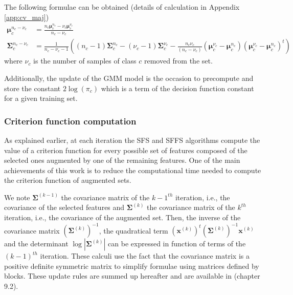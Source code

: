 \documentclass[a4paper,11pt,DIV=16]{scrartcl}
\begin{document}
        The following formulae can be obtained (details of calculation in Appendix \ref{app:cv_maj})
        \begin{align}
            \boldsymbol{\mu}_c^{n_c-\nu_c} &= \frac{n_c \boldsymbol{\mu}_c^{n_c} - \nu_c \boldsymbol{\mu}_c^{\nu_c}}{n_c - \nu_c} \\
            \boldsymbol{\Sigma}_c^{n_c-\nu_c} &= \frac{1}{n_c-\nu_c-1} ( (n_c-1) \boldsymbol{\Sigma}_c^{n_c} - (\nu_c-1) \boldsymbol{\Sigma}_c^{\nu_c} - \frac{n_c \nu_c}{(n_c-\nu_c)} (\boldsymbol{\mu}_c^{\nu_c}-\boldsymbol{\mu}_c^{n_c})(\boldsymbol{\mu}_c^{\nu_c}-\boldsymbol{\mu}_c^{n_c})^t)
        \end{align}
        where $\nu_c$ is the number of samples of class $c$ removed from the set.

        Additionally, the update of the GMM model is the occasion to precompute and store the constant $2 \log (\pi_c)$ which is a term of the decision function constant for a given training set.

        \subsubsection{Criterion function computation}

        As explained earlier, at each iteration the SFS and SFFS algorithms compute the value of a criterion function for every possible set of features composed of the selected ones augmented by one of the remaining features. One of the main achievements of this work is to reduce the computational time needed to compute the criterion function of augmented sets.

        We note $\boldsymbol{\Sigma}^{(k-1)}$ the covariance matrix of the $k-1^{th}$ iteration, i.e., the covariance of the selected features and $\boldsymbol{\Sigma}^{(k)}$ the covariance matrix of the $k^{th}$ iteration, i.e., the covariance of the augmented set. Then, the inverse of the covariance matrix $(\boldsymbol{\Sigma}^{(k)})^{-1}$, the quadratical term $(\mathbf{x}^{(k)})^t (\boldsymbol{\Sigma}^{(k)})^{-1} \mathbf{x}^{(k)}$ and the determinant $\log |\boldsymbol{\Sigma}^{(k)}|$ can be expressed in function of terms of the $(k-1)^{th}$ iteration. These calculi use the fact that the covariance matrix is a positive definite symmetric matrix to simplify formulae using matrices defined by blocks. These update rules are summed up hereafter and are available in \cite{webb2003statistical} (chapter 9.2).
\end{document}
